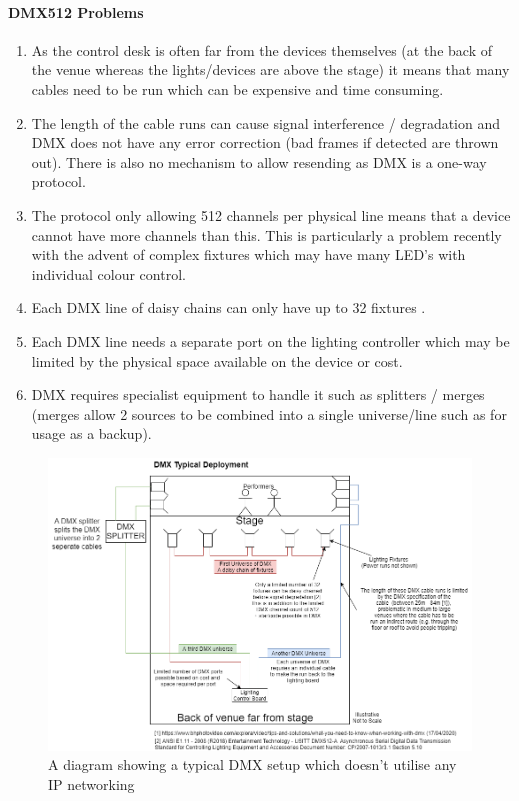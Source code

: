 \documentclass[11pt,a4paper]{article}
\begin{document}
\paragraph*{DMX512 Problems}
\begin{enumerate}{}
	\item As the control desk is often far from the devices themselves (at the back of the venue whereas the lights/devices are above the stage) it means that many cables need to be run which can be expensive and time consuming.
	\item The length of the cable runs can cause signal interference / degradation and DMX does not have any error correction (bad frames if detected are thrown out). There is also no mechanism to allow resending as DMX is a one-way protocol.
	\item The protocol only allowing 512 channels per physical line means that a device cannot have more channels than this. This is particularly a problem recently with the advent of complex fixtures which may have many LED's with individual colour control.
	\item Each DMX line of daisy chains can only have up to 32 fixtures \cite{ANSI_E1.11}.
	\item Each DMX line needs a separate port on the lighting controller which may be limited by the physical space available on the device or cost.
	\item DMX requires specialist equipment to handle it such as splitters / merges (merges allow 2 sources to be combined into a single universe/line such as for usage as a backup).
\end{enumerate}

\begin{figure}[H]
	\label{DMX_TYPICAL_SETUP}
	\includegraphics[width=\textwidth]{TypicalDmxSetup.png}
	\caption{A diagram showing a typical DMX setup which doesn't utilise any IP networking}
\end{figure}
\end{document}
